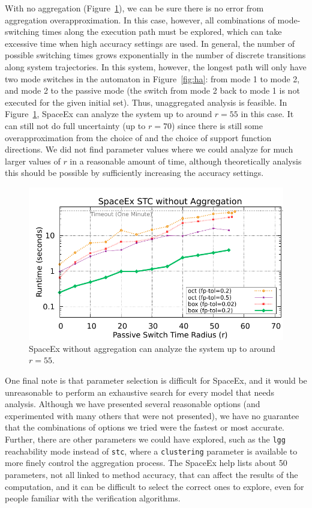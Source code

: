 With no aggregation (Figure~\ref{fig:spaceex_unagg}), we can be sure there is no error from aggregation overapproximation.
%
In this case, however, all combinations of mode-switching times along the execution path must be explored,
which can take excessive time when high accuracy settings are used.
%
In general, the number of possible switching times grows exponentially in the number of discrete transitions along system trajectories.
%
In this system, however, the longest path will only have two mode switches in the automaton in Figure~\ref{fig:ha}:
from mode 1 to mode 2, and mode 2 to the passive mode (the switch from mode 2 back to mode 1 is not executed for the given initial set).
%
Thus, unaggregated analysis is feasible.
%
In Figure~\ref{fig:spaceex_unagg}, SpaceEx can analyze the system up to around $r=55$ in this case.
%
It can still not do full uncertainty (up to $r=70$) since there is still some overapproximation from the choice of  and the
choice of support function directions.
%
We did not find parameter values where we could analyze for much larger values of $r$ in a reasonable amount of time,
although theoretically analysis this should be possible by sufficiently increasing the accuracy settings.

\begin{figure}[t]
\centerline{\includegraphics[width=0.9\columnwidth]{images/unagg.pdf}}
\caption{SpaceEx without aggregation can analyze the system up to around $r=55$.}
\label{fig:spaceex_unagg}
\end{figure}

One final note is that parameter selection is difficult for SpaceEx, and it would be unreasonable to perform an exhaustive search for every model
that needs analysis.
%
Although we have presented several reasonable options (and experimented with many others that were not presented), we have no guarantee that
the combinations of options we tried were the fastest or most accurate.
%
Further, there are other parameters we could have explored, such as the \texttt{lgg} reachability mode instead of \texttt{stc}, where a \texttt{clustering}
parameter is available to more finely control the aggregation process.
%
The SpaceEx help lists about 50 parameters, not all linked to method accuracy, that can affect the results of the computation,
and it can be difficult to select the correct ones to explore, even for people familiar with the verification algorithms.

